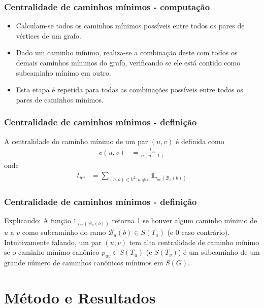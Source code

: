 \documentclass{beamer}
\begin{document}
        \begin{frame}
            \frametitle{Centralidade de caminhos mínimos - computação}
            \begin{itemize}
                \item Calculam-se todos os caminhos mínimos possíveis entre todos os pares de vértices de um grafo.
                \item Dado um caminho mínimo, realiza-se a combinação deste com todos os demais caminhos mínimos do grafo, verificando se ele está contido como subcaminho mínimo em outro.
                \item Esta etapa é repetida para todas as combinações possíveis entre todos os pares de caminhos mínimos.
            \end{itemize}
        \end{frame}

        \begin{frame}
            \frametitle{Centralidade de caminhos mínimos - definição}
                A centralidade do caminho mínimo de um par $(u, v)$ é definida como
                \begin{align*}
                    c(u, v) &= \frac{t_{uv}}{n(n - 1)}
                \end{align*}
                onde
                \begin{align*}
                    t_{uv} &= \sum_{(a,b) \in V^2 : a \neq b} \mathbb{1}_{\tau_{uv}(\mathcal{B}_a(b))}
                \end{align*}
        \end{frame}

        \begin{frame}
            \frametitle{Centralidade de caminhos mínimos - definição}
            Explicando: A função $\mathbb{1}_{\tau_{uv}(\mathcal{B}_a(b))}$ retorna 1 se houver algum caminho mínimo de $u$ a $v$ como subcaminho do ramo $\mathcal{B}_a(b) \in S (T_a)$ (e 0 caso contrário). Intuitivamente falando, um par $(u, v)$ tem alta centralidade de caminho mínimo se o caminho mínimo canônico $p_{uv} \in S(T_u)$ (e $S(T_v)$) é um subcaminho de um grande número de caminhos canônicos mínimos em $S(G)$.
        \end{frame}

\section{Método e Resultados}
\end{document}
